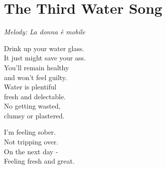 \section{The Third Water Song}

\textit{Melody: La donna è mobile}

Drink up your water glass.\\
It just might save your ass.\\
You'll remain healthy\\
and won't feel guilty.\\
Water is plentiful\\
fresh and delectable.\\
No getting wasted,\\
clumsy or plastered.

I'm feeling sober.\\
Not tripping over.\\
On the next day -\\
Feeling fresh and great.